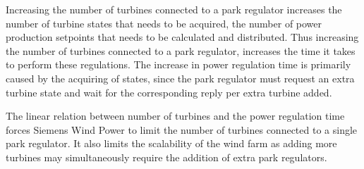 Increasing the number of turbines connected to a park regulator increases the number of turbine states that needs to be acquired, the number of power production setpoints that needs to be calculated and distributed. Thus increasing the number of turbines connected to a park regulator, increases the time it takes to perform these regulations. The increase in power regulation time is primarily caused by the acquiring of states, since the park regulator must request an extra turbine state and wait for the corresponding reply per extra turbine added.

The linear relation between number of turbines and the power regulation time forces Siemens Wind Power to limit the number of turbines connected to a single park regulator. It also limits the scalability of the wind farm as adding more turbines may simultaneously require the addition of extra park regulators.



